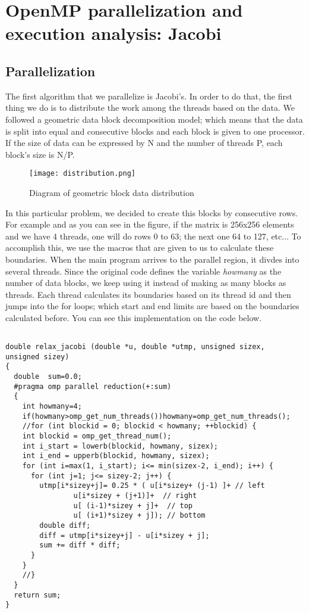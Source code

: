 \section{OpenMP parallelization and execution analysis: Jacobi}
\subsection{Parallelization}
\justify
The first algorithm that we parallelize is Jacobi's. In order to do that, the first thing we do is to distribute the work among the threads based on the data. We followed a geometric data block decomposition model; which means that the data is split into equal and consecutive blocks and each block is given to one processor. If the size of data can be expressed by N and the number of threads P, each block's size is N/P.
\justify
\begin{figure}[h!]
    \centering
    \texttt{[image: distribution.png]}
    \caption{Diagram of geometric block data distribution}
    \label{fig:dist}
\end{figure}
\justify
In this particular problem, we decided to create this blocks by consecutive rows. For example and as you can see in the figure, if the matrix is 256x256 elements and we have 4 threads, one will do rows 0 to 63; the next one 64 to 127, etc...
\justify
To accomplish this, we use the macros that are given to us to calculate these boundaries. When the main program arrives to the parallel region, it divdes into several threads. Since the original code defines the variable \textit{howmany} as the number of data blocks, we keep using it instead of making as many blocks as threads. Each thread calculates its boundaries based on its thread id and then jumps into the for loops; which start and end limits are based on the boundaries calculated before. You can see this implementation on the code below.
\clearpage
\begin{lstlisting}

double relax_jacobi (double *u, double *utmp, unsigned sizex, 
unsigned sizey)
{
  double  sum=0.0;
  #pragma omp parallel reduction(+:sum)
  {
    int howmany=4;
    if(howmany>omp_get_num_threads())howmany=omp_get_num_threads();
    //for (int blockid = 0; blockid < howmany; ++blockid) {
    int blockid = omp_get_thread_num();
    int i_start = lowerb(blockid, howmany, sizex);
    int i_end = upperb(blockid, howmany, sizex);
    for (int i=max(1, i_start); i<= min(sizex-2, i_end); i++) {
      for (int j=1; j<= sizey-2; j++) {
        utmp[i*sizey+j]= 0.25 * ( u[i*sizey+ (j-1) ]+ // left
				u[i*sizey + (j+1)]+  // right
				u[ (i-1)*sizey + j]+  // top
				u[ (i+1)*sizey + j]); // bottom
        double diff;	
        diff = utmp[i*sizey+j] - u[i*sizey + j];
        sum += diff * diff; 
	  }
	}
	//}
  }
  return sum;
}
\end{lstlisting}
